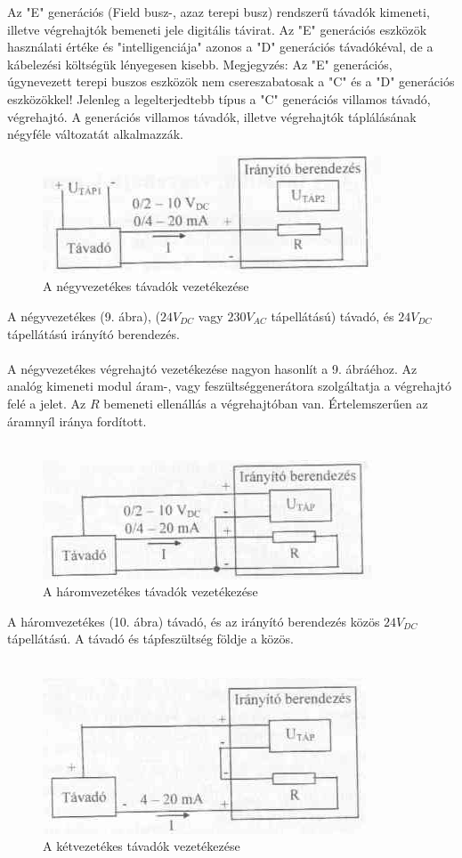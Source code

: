 \documentclass[11pt,a4paper]{article}
\begin{document}
Az "E" generációs (Field busz-, azaz terepi busz) rendszerű távadók kimeneti, illetve végrehajtók bemeneti jele digitális távirat. Az "E" generációs eszközök használati értéke és "intelligenciája" azonos a "D" generációs távadókéval, de a kábelezési költségük lényegesen kisebb. Megjegyzés: Az "E" generációs, úgynevezett terepi buszos eszközök nem csereszabatosak a "C" és a "D" generációs eszközökkel!			
Jelenleg a legelterjedtebb típus a "C" generációs villamos távadó, végrehajtó. A generációs villamos távadók, illetve végrehajtók táplálásának négyféle változatát alkalmazzák.
\begin{figure}[hbtp]
    	 \centering
		\includegraphics[scale=1.0]{9_negyvez_tav.png}
		\caption{A négyvezetékes távadók vezetékezése}
\end{figure}
$$$$
A négyvezetékes (9. ábra), ($24 V_{DC}$ vagy $230 V_{AC}$  tápellátású) távadó, és $24 V_{DC}$ tápellátású irányító berendezés.
\\\\
A négyvezetékes végrehajtó vezetékezése nagyon hasonlít a 9. ábráéhoz. Az analóg kimeneti modul áram-, vagy feszültséggenerátora szolgáltatja a végrehajtó felé a jelet. Az $R$ bemeneti ellenállás a végrehajtóban van. Értelemszerűen az áramnyíl iránya fordított.
\\\\
\begin{figure}[hbtp]
    	 \centering
		\includegraphics[scale=1.0]{10_haromvez_tav.png}
		\caption{A háromvezetékes távadók vezetékezése}
\end{figure}
A  háromvezetékes (10. ábra) távadó, és az irányító berendezés közös $24 V_{DC}$ tápellátású. A távadó és tápfeszültség földje a közös.
\\\\
\begin{figure}[hbtp]
    	 \centering
		\includegraphics[scale=1.0]{11_ketvez_tav.png}
		\caption{A kétvezetékes távadók vezetékezése}
\end{figure}
\end{document}
